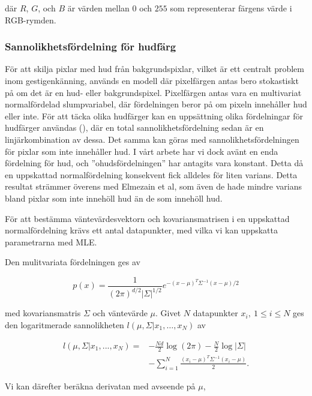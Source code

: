 \documentclass[../rapport_MVEX01-11-05]{subfiles}
\begin{document}
där $R$, $G$, och $B$ är värden mellan $0$ och $255$ som representerar
färgens värde i RGB-rymden.

\subsubsection{Sannolikhetsfördelning för hudfärg}

För att skilja pixlar med hud från bakgrundspixlar, vilket är ett
centralt problem inom gestigenkänning, används en modell där pixelfärgen antas
bero stokastiskt på om det är en hud- eller
bakgrundspixel. Pixelfärgen antas vara en multivariat normalfördelad
slumpvariabel, där fördelningen beror på om pixeln innehåller hud
eller inte. För att täcka olika hudfärger kan en uppsättning olika
fördelningar för hudfärger användas (\cite{Elmezain08}), där en total
sannolikhetsfördelning sedan är en linjärkombination av dessa. Det
samma kan göras med sannolikhetsfördelningen för pixlar som inte
innehåller hud. I vårt arbete har vi dock avänt en enda fördelning för
hud, och ''ohudsfördelningen'' har antagits vara konstant. Detta då en
uppskattad normalfördelning konsekvent fick alldeles för liten
varians. Detta resultat strämmer överens med Elmezain et al, som även
de hade mindre varians bland pixlar som inte innehöll hud än de som
innehöll hud.

För att bestämma väntevärdesvektorn och kovariansmatrisen i en
uppskattad normalfördelning krävs ett
antal datapunkter, med vilka vi kan uppskatta parametrarna med MLE.

Den mulitvariata fördelningen ges av

\begin{equation*}
  p(x)=\frac{1}{(2\pi)^{d/2}|\Sigma|^{1/2}}e^{-(x-\mu)^T\Sigma^{-1}(x-\mu)/2}
\end{equation*}

med kovariansmatris $\Sigma$ och väntevärde $\mu$.
Givet $N$ datapunkter $x_i,\:1\leq i\leq N$ ges den logaritmerade
sannolikheten $l(\mu,\Sigma|x_1,{\ldots} ,x_N)$ av

\begin{equation*}
  \begin{aligned}
  l(\mu,\Sigma|x_1,...,x_N) = &-\frac{Nd}{2}\log(2\pi)-\frac{N}{2}\log|\Sigma|\\
                              &-\sum_{i=1}^N\frac{(x_i-\mu)^T\Sigma^{-1}(x_i-\mu)}{2}.
  \end{aligned}
\end{equation*}

Vi kan därefter beräkna derivatan med avseende på $\mu$,
\end{document}
